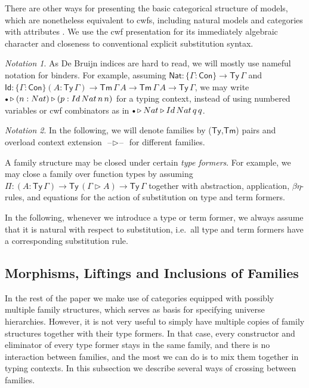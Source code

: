 \documentclass[a4paper,UKenglish,cleveref, autoref, thm-restate]{lipics-v2021}
\theoremstyle{remark}
\newtheorem{notation}{Notation}
\theoremstyle{definition}
\newcommand{\Con}{\mathsf{Con}}
\newcommand{\Ty}{\mathsf{Ty}}
\newcommand{\Tm}{\mathsf{Tm}}
\newcommand{\emptycon}{\scaleobj{.75}\bullet}
\newcommand{\ext}{\triangleright}
\newcommand{\blank}{\mathord{\hspace{1pt}\text{--}\hspace{1pt}}}
\newcommand{\q}{\mathsf{q}}
\newcommand{\Id}{\mathsf{Id}}
\newcommand{\Nat}{\mathsf{Nat}}
\begin{document}
There are other ways for presenting the basic categorical structure of models,
which are nonetheless equivalent to cwfs, including natural models
\cite{awodey18natural} and categories with attributes \cite{cartmellthesis}. We
use the cwf presentation for its immediately algebraic character and closeness
to conventional explicit substitution syntax.

\begin{notation}As De Bruijn indices are hard to read, we will mostly use
nameful notation for binders. For example, assuming $\Nat : \{\Gamma : \Con\}
\to \Ty\,\Gamma$ and $\Id : \{\Gamma : \Con\}(A : \Ty\,\Gamma) \to
\Tm\,\Gamma\,A \to \Tm\,\Gamma\,A \to \Ty\,\Gamma$, we may write $\emptycon \ext
(n : \Nat) \ext (p : \Id\,\Nat\,n\,n)$ for a typing context, instead of using
numbered variables or cwf combinators as in $\emptycon \ext \Nat \ext
\Id\,\Nat\,\q\,\q$.
\end{notation}

\begin{notation}
In the following, we will denote families by ($\Ty$,$\Tm$) pairs and overload context
extension $\blank\ext\blank$ for different families.
\end{notation}

A family structure may be closed under certain \emph{type formers}. For example,
we may close a family over function types by assuming $\Pi : (A : \Ty\,\Gamma)
\to \Ty\,(\Gamma\ext A) \to \Ty\,\Gamma$ together with abstraction, application,
$\beta\eta$-rules, and equations for the action of substitution on type and term
formers.

In the following, whenever we introduce a type or term former, we always assume
that it is natural with respect to substitution, i.e.\ all type and term formers
have a corresponding substitution rule.

\subsection{Morphisms, Liftings and Inclusions of Families}
\label{sec:morphisms}

In the rest of the paper we make use of categories equipped with possibly
multiple family structures, which serves as basis for specifying universe
hierarchies. However, it is not very useful to simply have multiple copies of
family structures together with their type formers. In that case, every
constructor and eliminator of every type former stays in the same family, and
there is no interaction between families, and the most we can do is to mix them
together in typing contexts. In this subsection we describe several ways of
crossing between families.
\end{document}
